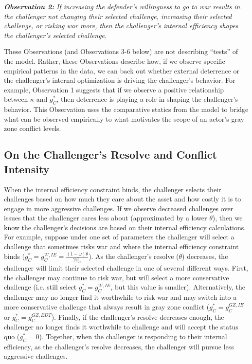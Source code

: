 \documentclass[11pt,letterpaper,pdftex,dvipsnames,table]{article}
\begin{document}
\textbf{\textit{Observation 2:}}\textit{ If increasing the defender's willingness to go to war results in the challenger not changing their selected challenge, increasing their selected challenge, or risking war more, then the challenger's internal efficiency shapes the challenger's selected challenge.}

These Observations (and Observations 3-6 below) are not describing ``tests'' of the model. Rather, these Observations describe how, if we observe specific empirical patterns in the data, we can back out whether external deterrence or the challenger's internal optimization is driving the challenger's behavior. For example, Observation 1 suggests that if we observe a positive relationship between $\kappa$ and $g_{C}^{*}$, then deterrence is playing a role in shaping the challenger's behavior. This Observation uses the comparative statics from the model to bridge what can be observed empirically to what motivates the scope of an actor's gray zone conflict levels.

\subsection{On the Challenger's Resolve and Conflict Intensity}

When the internal efficiency constraint binds, the challenger selects their challenges based on how much they care about the asset and how costly it is to engage in more aggressive challenges. If we observe decreased challenges over issues that the challenger cares less about (approximated by a lower $\theta$), then we know the challenger's decisions are based on their internal efficiency calculations. For example, suppose under one set of parameters the challenger will select a challenge that sometimes risks war and where the internal efficiency constraint binds ($g_{C}^{*}=g_{C}^{W,IE}=\frac{(1-\omega)\theta}{2\beta_{C}}$). As the challenger's resolve ($\theta$) decreases, the challenger will limit their selected challenge in one of several different ways. First, the challenger may continue to risk war, but will select a more conservative challenge (i.e. still select $g_{C}^{*}=g_{C}^{W,IE}$, but this value is smaller). Alternatively, the challenger may no longer find it worthwhile to risk war and may switch into a more conservative challenge that always result in gray zone conflict ($g_{C}^{*}=g_{C}^{GZ,IE}$ or $g_{C}^{*}=g_{C}^{GZ,EDT}$). Finally, if the challenger's resolve decreases enough, the challenger no longer finds it worthwhile to challenge and will accept the status quo ($g_{C}^{*}=0$). Together, when the challenger is responding to their internal efficiency, as the challenger's resolve decreases, the challenger will pursue less aggressive challenges.
\end{document}
